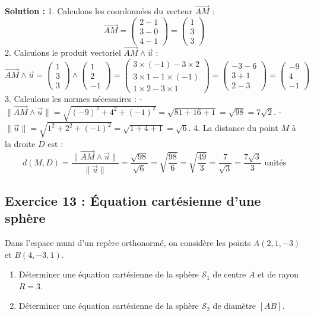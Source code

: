 \textbf{Solution :}
1. Calculons les coordonnées du vecteur $\vec{AM}$ :
   \[
   \vec{AM} = \begin{pmatrix} 2 - 1 \\ 3 - 0 \\ 4 - 1 \end{pmatrix} = \begin{pmatrix} 1 \\ 3 \\ 3 \end{pmatrix}
   \]
2. Calculons le produit vectoriel $\vec{AM} \wedge \vec{u}$ :
   \[
   \vec{AM} \wedge \vec{u} = \begin{pmatrix} 1 \\ 3 \\ 3 \end{pmatrix} \wedge \begin{pmatrix} 1 \\ 2 \\ -1 \end{pmatrix} = \begin{pmatrix} 3 \times (-1) - 3 \times 2 \\ 3 \times 1 - 1 \times (-1) \\ 1 \times 2 - 3 \times 1 \end{pmatrix} = \begin{pmatrix} -3 - 6 \\ 3 + 1 \\ 2 - 3 \end{pmatrix} = \begin{pmatrix} -9 \\ 4 \\ -1 \end{pmatrix}
   \]
3. Calculons les normes nécessaires :
   - $\|\vec{AM} \wedge \vec{u}\| = \sqrt{(-9)^2 + 4^2 + (-1)^2} = \sqrt{81 + 16 + 1} = \sqrt{98} = 7\sqrt{2}$.
   - $\|\vec{u}\| = \sqrt{1^2 + 2^2 + (-1)^2} = \sqrt{1 + 4 + 1} = \sqrt{6}$.
4. La distance du point $M$ à la droite $D$ est :
   \[
   d(M, D) = \frac{\|\vec{AM} \wedge \vec{u}\|}{\|\vec{u}\|} = \frac{\sqrt{98}}{\sqrt{6}} = \sqrt{\frac{98}{6}} = \sqrt{\frac{49}{3}} = \frac{7}{\sqrt{3}} = \frac{7\sqrt{3}}{3} \text{ unités}
   \]

\subsection*{Exercice 13 : Équation cartésienne d'une sphère}
Dans l'espace muni d'un repère orthonormé, on considère les points $A(2, 1, -3)$ et $B(4, -3, 1)$.
\begin{enumerate}
    \item Déterminer une équation cartésienne de la sphère $\mathcal{S}_1$ de centre $A$ et de rayon $R = 3$.
    \item Déterminer une équation cartésienne de la sphère $\mathcal{S}_2$ de diamètre $[AB]$.
\end{enumerate}

